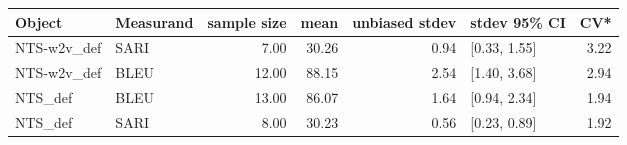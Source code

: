 \begin{tabular}{llrrrlr}
\toprule
      Object & Measurand & sample size &  mean & unbiased stdev &  stdev 95\% CI &  CV* \\
\midrule
     NTS-w2v\_def &      SARI &        7.00 & 30.26 &           0.94 &  [0.33, 1.55] & 3.22 \\
     NTS-w2v\_def &      BLEU &       12.00 & 88.15 &           2.54 &  [1.40, 3.68] & 2.94 \\
     NTS\_def &      BLEU &       13.00 & 86.07 &           1.64 &  [0.94, 2.34] & 1.94 \\
     NTS\_def &      SARI &        8.00 & 30.23 &           0.56 &  [0.23, 0.89] & 1.92 \\
\bottomrule
\end{tabular}
